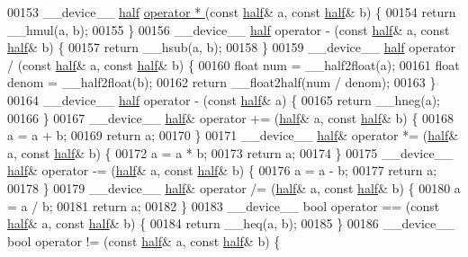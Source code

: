 \begin{DoxyCode}
00153 \_\_device\_\_ \hyperlink{struct_eigen_1_1half}{half} \hyperlink{namespace_eigen_a32970f7eb62fe31eeefee72d24a046d0}{operator * }(\textcolor{keyword}{const} \hyperlink{struct_eigen_1_1half}{half}& a, \textcolor{keyword}{const} \hyperlink{struct_eigen_1_1half}{half}& b) \{
00154   \textcolor{keywordflow}{return} \_\_hmul(a, b);
00155 \}
00156 \_\_device\_\_ \hyperlink{struct_eigen_1_1half}{half} operator - (\textcolor{keyword}{const} \hyperlink{struct_eigen_1_1half}{half}& a, \textcolor{keyword}{const} \hyperlink{struct_eigen_1_1half}{half}& b) \{
00157   \textcolor{keywordflow}{return} \_\_hsub(a, b);
00158 \}
00159 \_\_device\_\_ \hyperlink{struct_eigen_1_1half}{half} operator / (\textcolor{keyword}{const} \hyperlink{struct_eigen_1_1half}{half}& a, \textcolor{keyword}{const} \hyperlink{struct_eigen_1_1half}{half}& b) \{
00160   \textcolor{keywordtype}{float} num = \_\_half2float(a);
00161   \textcolor{keywordtype}{float} denom = \_\_half2float(b);
00162   \textcolor{keywordflow}{return} \_\_float2half(num / denom);
00163 \}
00164 \_\_device\_\_ \hyperlink{struct_eigen_1_1half}{half} operator - (\textcolor{keyword}{const} \hyperlink{struct_eigen_1_1half}{half}& a) \{
00165   \textcolor{keywordflow}{return} \_\_hneg(a);
00166 \}
00167 \_\_device\_\_ \hyperlink{struct_eigen_1_1half}{half}& operator += (\hyperlink{struct_eigen_1_1half}{half}& a, \textcolor{keyword}{const} \hyperlink{struct_eigen_1_1half}{half}& b) \{
00168   a = a + b;
00169   \textcolor{keywordflow}{return} a;
00170 \}
00171 \_\_device\_\_ \hyperlink{struct_eigen_1_1half}{half}& operator *= (\hyperlink{struct_eigen_1_1half}{half}& a, \textcolor{keyword}{const} \hyperlink{struct_eigen_1_1half}{half}& b) \{
00172   a = a * b;
00173   \textcolor{keywordflow}{return} a;
00174 \}
00175 \_\_device\_\_ \hyperlink{struct_eigen_1_1half}{half}& operator -= (\hyperlink{struct_eigen_1_1half}{half}& a, \textcolor{keyword}{const} \hyperlink{struct_eigen_1_1half}{half}& b) \{
00176   a = a - b;
00177   \textcolor{keywordflow}{return} a;
00178 \}
00179 \_\_device\_\_ \hyperlink{struct_eigen_1_1half}{half}& operator /= (\hyperlink{struct_eigen_1_1half}{half}& a, \textcolor{keyword}{const} \hyperlink{struct_eigen_1_1half}{half}& b) \{
00180   a = a / b;
00181   \textcolor{keywordflow}{return} a;
00182 \}
00183 \_\_device\_\_ \textcolor{keywordtype}{bool} operator == (\textcolor{keyword}{const} \hyperlink{struct_eigen_1_1half}{half}& a, \textcolor{keyword}{const} \hyperlink{struct_eigen_1_1half}{half}& b) \{
00184   \textcolor{keywordflow}{return} \_\_heq(a, b);
00185 \}
00186 \_\_device\_\_ \textcolor{keywordtype}{bool} operator != (\textcolor{keyword}{const} \hyperlink{struct_eigen_1_1half}{half}& a, \textcolor{keyword}{const} \hyperlink{struct_eigen_1_1half}{half}& b) \{

\end{DoxyCode}
